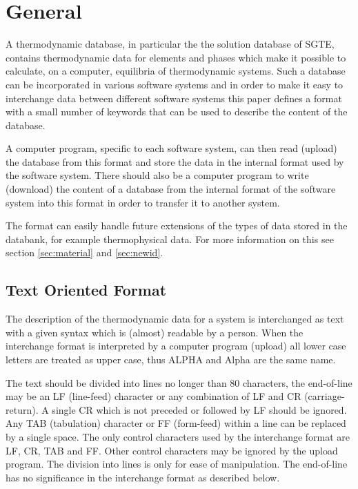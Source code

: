 \documentclass[12pt]{article}
\begin{document}
\section{General}

A thermodynamic database, in particular the the solution database of
SGTE, contains thermodynamic data for elements and phases which make
it possible to calculate, on a computer, equilibria of thermodynamic
systems. Such a database can be incorporated in various software
systems and in order to make it easy to interchange data between different
software systems this paper defines a format with a small number of
keywords that can be used to describe the content of the database.

A computer program, specific to each software system, can then read
(upload) the database from this format and store the data in the
internal format used by the software system. There should also be a
computer program to write (download) the content of a database from
the internal format of the software system into this format in order
to transfer it to another system.

The format can easily handle future extensions of the types of data
stored in the databank, for example thermophysical data. For more
information on this see section \ref{sec:material} and \ref{sec:newid}.

\subsection{Text Oriented Format}

The description of the thermodynamic data for a system is interchanged
as text with a given syntax which is (almost) readable by a person.
When the interchange format is interpreted by a computer program
(upload) all lower case letters are treated as upper case, thus ALPHA
and Alpha are the same name.

The text should be divided into lines no longer than 80 characters,
the end-of-line may be an LF (line-feed) character or any combination
of LF and CR (carriage-return). A single CR which is not preceded or
followed by LF should be ignored. Any TAB (tabulation) character or FF
(form-feed) within a line can be replaced by a single space. The only
control characters used by the interchange format are LF, CR, TAB and
FF. Other control characters may be ignored by the upload program. The
division into lines is only for ease of manipulation. The end-of-line
has no significance in the interchange format as described below.
\end{document}
